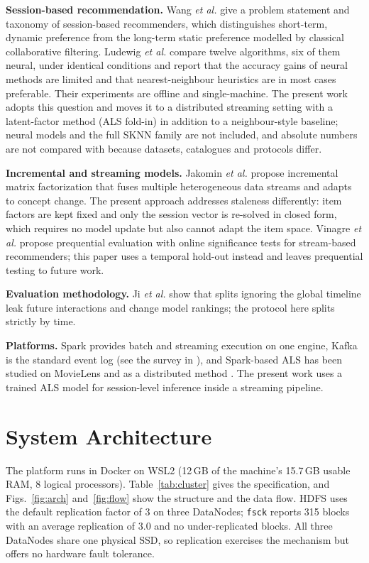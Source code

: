 \documentclass[10pt,journal]{IEEEtran}
\begin{document}
\textbf{Session-based recommendation.} Wang \emph{et al.} \cite{wang2021survey} give a problem statement and taxonomy of session-based recommenders, which distinguishes short-term, dynamic preference from the long-term static preference modelled by classical collaborative filtering. Ludewig \emph{et al.} \cite{ludewig2021} compare twelve algorithms, six of them neural, under identical conditions and report that the accuracy gains of neural methods are limited and that nearest-neighbour heuristics are in most cases preferable. Their experiments are offline and single-machine. The present work adopts this question and moves it to a distributed streaming setting with a latent-factor method (ALS fold-in) in addition to a neighbour-style baseline; neural models and the full SKNN family are not included, and absolute numbers are not compared with \cite{ludewig2021} because datasets, catalogues and protocols differ.

\textbf{Incremental and streaming models.} Jakomin \emph{et al.} \cite{jakomin2020simf} propose incremental matrix factorization that fuses multiple heterogeneous data streams and adapts to concept change. The present approach addresses staleness differently: item factors are kept fixed and only the session vector is re-solved in closed form, which requires no model update but also cannot adapt the item space. Vinagre \emph{et al.} \cite{vinagre2021eval} propose prequential evaluation with online significance tests for stream-based recommenders; this paper uses a temporal hold-out instead and leaves prequential testing to future work.

\textbf{Evaluation methodology.} Ji \emph{et al.} \cite{ji2023leakage} show that splits ignoring the global timeline leak future interactions and change model rankings; the protocol here splits strictly by time.

\textbf{Platforms.} Spark \cite{zaharia2016spark} provides batch and streaming execution on one engine, Kafka is the standard event log (see the survey in \cite{raptis2023kafka}), and Spark-based ALS has been studied on MovieLens \cite{li2020als} and as a distributed method \cite{kumar2021edmfals}. The present work uses a trained ALS model for session-level inference inside a streaming pipeline.

\section{System Architecture}
The platform runs in Docker on WSL2 (12\,GB of the machine's 15.7\,GB usable RAM, 8 logical processors). Table~\ref{tab:cluster} gives the specification, and Figs.~\ref{fig:arch} and~\ref{fig:flow} show the structure and the data flow. HDFS uses the default replication factor of 3 on three DataNodes; \texttt{fsck} reports 315 blocks with an average replication of 3.0 and no under-replicated blocks. All three DataNodes share one physical SSD, so replication exercises the mechanism but offers no hardware fault tolerance.
\end{document}
